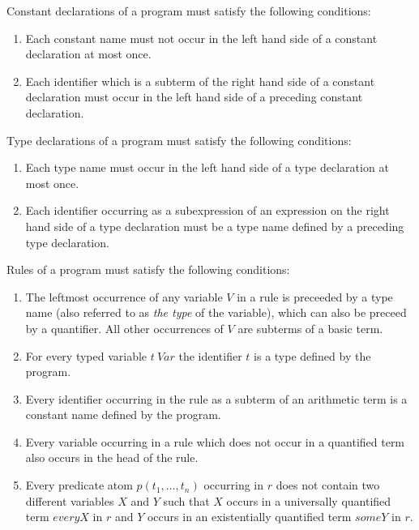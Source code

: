 \documentclass[a4paper,10pt]{article}
\begin{document}
\noindent\vspace{0.2cm}

Constant declarations of a program must satisfy the following conditions:
\begin{enumerate}
\item Each constant name must not occur in the left hand side of a constant declaration at most once.
\item Each identifier which is a subterm of the right hand side of a constant declaration must occur in the left hand side of a preceding constant declaration.   

\end{enumerate}



Type declarations of a program must satisfy the following conditions:
\begin{enumerate}
\item Each type name must occur in the left hand side of a type declaration at most once.
\item Each identifier occurring as  a subexpression of an expression on the right hand side of a  type declaration must be a type name defined by a preceding type declaration. 
\end{enumerate}


Rules of a program must satisfy the following conditions:

\begin{enumerate}


\item The leftmost occurrence of any variable  $V$ in a rule is preceeded by a type name (also referred to as \textit{the type} of the variable), which can also be preceed by a quantifier.
All other occurrences of $V$ are subterms of a basic term.
\item For every typed variable $t~Var$ the identifier $t$ is a type 
 defined by the program.
\item Every identifier  occurring in the rule as a subterm of an arithmetic term is a constant name defined by the program.
\item Every variable occurring in a rule which does not  occur in a quantified term also occurs in the head of the rule.
\item Every predicate atom $p(t_1,\ldots,t_n)$ occurring in $r$ does not contain two different variables $X$ and $Y$ such that $X$ occurs in a universally quantified term $every X$ in $r$ and $Y$ occurs in an existentially quantified term $some Y$ in $r$.
\end{enumerate}
\end{document}
